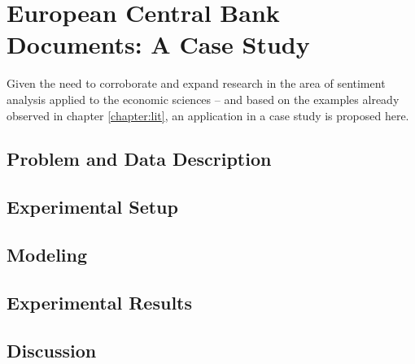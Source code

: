\chapter{\textbf{European Central Bank Documents: A Case Study}}

Given the need to corroborate and expand research in the area of sentiment analysis applied to the economic sciences -- and based on the examples already observed in chapter \ref{chapter:lit}, an application in a case study is proposed here.\\



\section{Problem and Data Description}



\section{Experimental Setup}

\section{Modeling}
\section{Experimental Results}

\section{Discussion}
